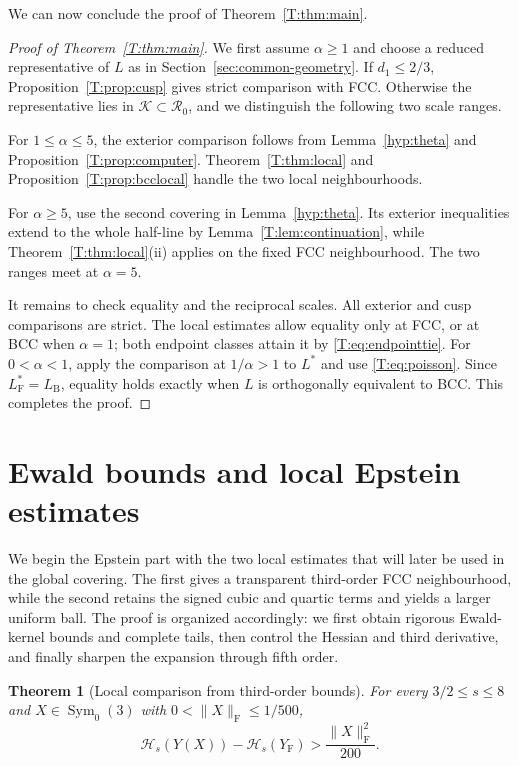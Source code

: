 \documentclass[reqno,english]{amsart}
\newtheorem{theorem}{Theorem}[section]
\theoremstyle{definition}
\newtheorem{open problem}[theorem]{Open Problem}
\theoremstyle{remark}
\theoremstyle{plain}
\numberwithin{equation}{section}
\newcommand{\FCC}{L_{\mathrm F}}
\newcommand{\B}{L_{\mathrm B}}
\newcommand{\BCC}{\B}
\newcommand{\YF}{Y_{\mathrm F}}
\newcommand{\HH}{\mathcal H}
\newcommand{\norm}[1]{\lVert#1\rVert_{\mathrm F}}
\newcommand{\calK}{\mathcal K}
\newcommand{\Symzero}{\operatorname{Sym}_0(3)}
\begin{document}
We can now conclude the proof of Theorem~\ref{T:thm:main}.
\begin{proof}[Proof of Theorem~\ref{T:thm:main}]
We first assume $\alpha\ge1$ and choose a reduced representative of
$L$ as in Section~\ref{sec:common-geometry}. If $d_1\le2/3$,
Proposition~\ref{T:prop:cusp} gives strict comparison with FCC.
Otherwise the representative lies in $\calK\subset\mathcal R_0$,
and we distinguish the following two scale ranges.

For $1\le\alpha\le5$, the exterior comparison follows from
Lemma~\ref{hyp:theta} and Proposition~\ref{T:prop:computer}.
Theorem~\ref{T:thm:local} and Proposition~\ref{T:prop:bcclocal}
handle the two local neighbourhoods.

For $\alpha\ge5$, use the second covering in
Lemma~\ref{hyp:theta}. Its exterior inequalities extend to the
whole half-line by Lemma~\ref{T:lem:continuation}, while
Theorem~\ref{T:thm:local}(ii) applies on the fixed FCC
neighbourhood. The two ranges meet at $\alpha=5$.

It remains to check equality and the reciprocal scales. All exterior
and cusp comparisons are strict. The local estimates allow equality
only at FCC, or at BCC when $\alpha=1$; both endpoint classes attain
it by \eqref{T:eq:endpointtie}. For $0<\alpha<1$, apply the
comparison at $1/\alpha>1$ to $L^*$ and use
\eqref{T:eq:poisson}. Since $\FCC^*=\BCC$, equality holds exactly
when $L$ is orthogonally equivalent to BCC. This
completes the proof.
\end{proof}

\section{Ewald bounds and local Epstein estimates}\label{sec:epstein-local}

We begin the Epstein part with the two local estimates that will later be used in the global covering. The first gives a transparent third-order FCC neighbourhood, while the second retains the signed cubic and quartic terms and yields a larger uniform ball. The proof is organized accordingly: we first obtain rigorous Ewald-kernel bounds and complete tails, then control the Hessian and third derivative, and finally sharpen the expansion through fifth order.

\begin{theorem}[Local comparison from third-order bounds]\label{E:thm:third-ball}
For every $3/2\le s\le8$ and $X\in\Symzero$ with
$0<\norm X\le1/500$,
\begin{equation}\label{E:eq:third-ball}
 \HH_s(Y(X))-\HH_s(\YF)>\frac{\norm X^2}{200}.
\end{equation}
\end{theorem}
\end{document}
